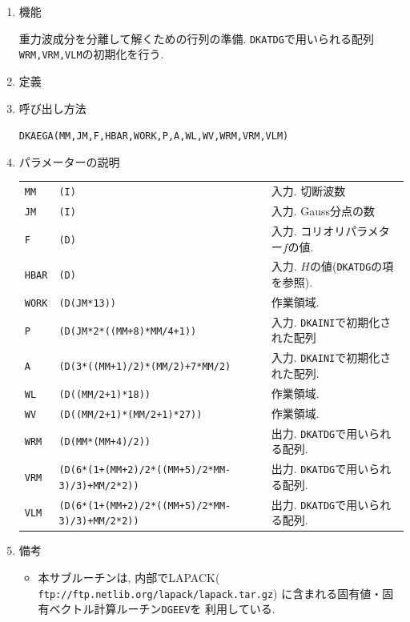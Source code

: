 \documentclass[a4j,fleqn]{jarticle}
\begin{document}
\begin{enumerate}

\item 機能

重力波成分を分離して解くための行列の準備.
{\tt DKATDG}で用いられる配列
{\tt WRM,VRM,VLM}の初期化を行う.

\item 定義

\item 呼び出し方法 
    
{\tt DKAEGA(MM,JM,F,HBAR,WORK,P,A,WL,WV,WRM,VRM,VLM)}
  
\item パラメーターの説明 
    
\begin{tabular}{lll}
{\tt MM} & {\tt (I)} & 入力. 切断波数\\
{\tt JM} & {\tt (I)} & 入力. Gauss分点の数\\
{\tt F}   & {\tt (D)} & 入力. コリオリパラメター$f$の値.\\
{\tt HBAR}   & {\tt (D)} & 入力. $H$の値({\tt DKATDG}の項を参照).\\
{\tt WORK}   & {\tt (D(JM*13))} & 作業領域.\\
{\tt P}  & {\tt (D(JM*2*((MM+8)*MM/4+1))} & 入力. {\tt DKAINI}で初期化された配列\\
{\tt A}  & {\tt (D(3*((MM+1)/2)*(MM/2)+7*MM/2)} & 入力. {\tt DKAINI}で初期化された配列.\\
{\tt WL}   & {\tt (D((MM/2+1)*18))} & 作業領域.\\
{\tt WV}   & {\tt (D((MM/2+1)*(MM/2+1)*27))} & 作業領域.\\
{\tt WRM}   & {\tt (D(MM*(MM+4)/2))} & 出力. {\tt DKATDG}で用いられる配列.\\
{\tt VRM}   & {\tt (D(6*(1+(MM+2)/2*((MM+5)/2*MM-3)/3)+MM/2*2))} & 出力. {\tt DKATDG}で用いられる配列.\\
{\tt VLM}   & {\tt (D(6*(1+(MM+2)/2*((MM+5)/2*MM-3)/3)+MM/2*2))} & 出力. {\tt DKATDG}で用いられる配列.
\end{tabular}

\item 備考

\begin{itemize}

\item 本サブルーチンは, 内部でLAPACK({\tt
ftp://ftp.netlib.org/lapack/lapack.tar.gz})
に含まれる固有値・固有ベクトル計算ルーチン{\tt DGEEV}を
利用している.

\end{itemize}

\end{enumerate}
\end{document}
